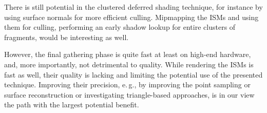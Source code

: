 There is still potential in the clustered deferred shading technique, for instance by using surface normals for more efficient culling. Mipmapping the ISMs and using them for culling, performing an early shadow lookup for entire clusters of fragments, would be interesting as well.

However, the final gathering phase is quite fast at least on high-end hardware, and, more importantly,  not detrimental to quality. While rendering the ISMs is fast as well, their quality is lacking and limiting the potential use of the presented technique. Improving their precision, e.\,g., by improving the point sampling or surface reconstruction or investigating triangle-based approaches, is in our view the path with the largest potential benefit.
